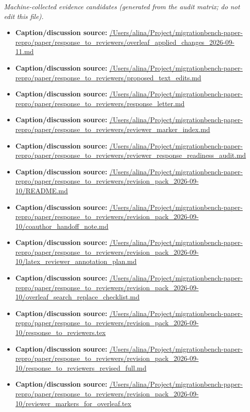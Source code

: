 \emph{Machine-collected evidence candidates (generated from the audit matrix; do not edit this file).}
\begin{itemize}[leftmargin=1.4em,noitemsep]
\item \textbf{Caption/discussion source:} \url{/Users/alina/Project/migrationbench-paper-repro/paper/response_to_reviewers/overleaf_applied_changes_2026-09-11.md}
\item \textbf{Caption/discussion source:} \url{/Users/alina/Project/migrationbench-paper-repro/paper/response_to_reviewers/proposed_text_edits.md}
\item \textbf{Caption/discussion source:} \url{/Users/alina/Project/migrationbench-paper-repro/paper/response_to_reviewers/response_letter.md}
\item \textbf{Caption/discussion source:} \url{/Users/alina/Project/migrationbench-paper-repro/paper/response_to_reviewers/reviewer_marker_index.md}
\item \textbf{Caption/discussion source:} \url{/Users/alina/Project/migrationbench-paper-repro/paper/response_to_reviewers/reviewer_response_readiness_audit.md}
\item \textbf{Caption/discussion source:} \url{/Users/alina/Project/migrationbench-paper-repro/paper/response_to_reviewers/revision_pack_2026-09-10/README.md}
\item \textbf{Caption/discussion source:} \url{/Users/alina/Project/migrationbench-paper-repro/paper/response_to_reviewers/revision_pack_2026-09-10/coauthor_handoff_note.md}
\item \textbf{Caption/discussion source:} \url{/Users/alina/Project/migrationbench-paper-repro/paper/response_to_reviewers/revision_pack_2026-09-10/latex_reviewer_annotation_plan.md}
\item \textbf{Caption/discussion source:} \url{/Users/alina/Project/migrationbench-paper-repro/paper/response_to_reviewers/revision_pack_2026-09-10/overleaf_search_replace_checklist.md}
\item \textbf{Caption/discussion source:} \url{/Users/alina/Project/migrationbench-paper-repro/paper/response_to_reviewers/revision_pack_2026-09-10/response_to_reviewers.tex}
\item \textbf{Caption/discussion source:} \url{/Users/alina/Project/migrationbench-paper-repro/paper/response_to_reviewers/revision_pack_2026-09-10/response_to_reviewers_revised_full.md}
\item \textbf{Caption/discussion source:} \url{/Users/alina/Project/migrationbench-paper-repro/paper/response_to_reviewers/revision_pack_2026-09-10/reviewer_markers_for_overleaf.tex}

\end{itemize}
